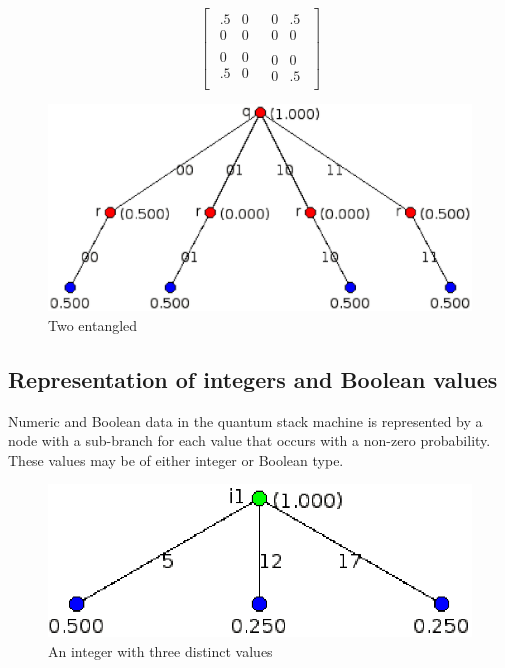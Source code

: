 {\begin{singlespace}
\[\left[
\begin{array}{c|c}
\begin{array}{cc}
.5&0\\0&0
\end{array} &
\begin{array}{cc}
0&.5\\0&0
\end{array}\\
\hline
\begin{array}{cc}
0&0\\.5&0\\
\end{array} &
\begin{array}{cc}
0&0\\0&.5
\end{array}
\end{array}\right]
\]
\end{singlespace}
}

\begin{figure}[htbp]
\centerline{
\includegraphics[scale=0.6]{images/entangledQbits.eps}
}
\caption{Two entangled \qbits}\label{fig:entangled}
\end{figure}

\subsection{Representation of integers and Boolean values}\label{subsec:representclassicaldata}
Numeric and Boolean
 data in the quantum stack machine is represented by a node with
a sub-branch for each value that occurs with a non-zero probability. 
These values may be of either integer or Boolean type.

\begin{figure}[htbp]
\centerline{
\includegraphics[scale=.6]{images/integer.eps}
}
\caption{An integer with three distinct values}\label{fig:integerofthree}
\end{figure}

